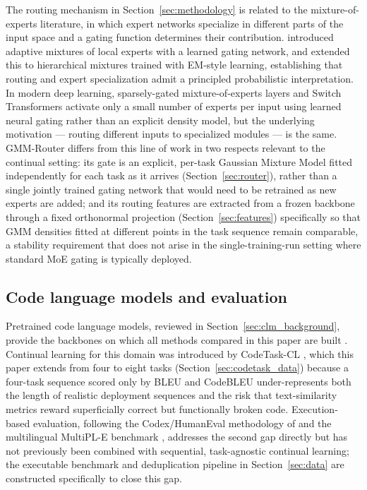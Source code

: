 The routing mechanism in Section~\ref{sec:methodology} is related to the mixture-of-experts literature, in which expert networks specialize in different parts of the input space and a gating function determines their contribution. \citet{jacobs1991adaptive} introduced adaptive mixtures of local experts with a learned gating network, and \citet{jordan1994hierarchical} extended this to hierarchical mixtures trained with EM-style learning, establishing that routing and expert specialization admit a principled probabilistic interpretation. In modern deep learning, sparsely-gated mixture-of-experts layers \citep{shazeer2017outrageously} and Switch Transformers \citep{fedus2022switch} activate only a small number of experts per input using learned neural gating rather than an explicit density model, but the underlying motivation --- routing different inputs to specialized modules --- is the same. GMM-Router differs from this line of work in two respects relevant to the continual setting: its gate is an explicit, per-task Gaussian Mixture Model fitted independently for each task as it arrives (Section~\ref{sec:router}), rather than a single jointly trained gating network that would need to be retrained as new experts are added; and its routing features are extracted from a frozen backbone through a fixed orthonormal projection (Section~\ref{sec:features}) specifically so that GMM densities fitted at different points in the task sequence remain comparable, a stability requirement that does not arise in the single-training-run setting where standard MoE gating is typically deployed.

\subsection{Code language models and evaluation}
\label{sec:rw_code}

Pretrained code language models, reviewed in Section~\ref{sec:clm_background}, provide the backbones on which all methods compared in this paper are built \citep{feng2020codebert,guo2021graphcodebert,guo2022unixcoder,ahmad2021plbart,wang2021codet5,wang2023codet5plus,fried2023incoder,roziere2023codellama,lozhkov2024starcoder2,hui2024qwen25coder}. Continual learning for this domain was introduced by CodeTask-CL \citep{yadav2023exploring}, which this paper extends from four to eight tasks (Section~\ref{sec:codetask_data}) because a four-task sequence scored only by BLEU \citep{papineni2002bleu} and CodeBLEU \citep{ren2020codebleu} under-represents both the length of realistic deployment sequences and the risk that text-similarity metrics reward superficially correct but functionally broken code. Execution-based evaluation, following the Codex/HumanEval methodology of \citet{chen2021evaluating} and the multilingual MultiPL-E benchmark \citep{cassano2023multipl}, addresses the second gap directly but has not previously been combined with sequential, task-agnostic continual learning; the executable benchmark and deduplication pipeline in Section~\ref{sec:data} are constructed specifically to close this gap.
